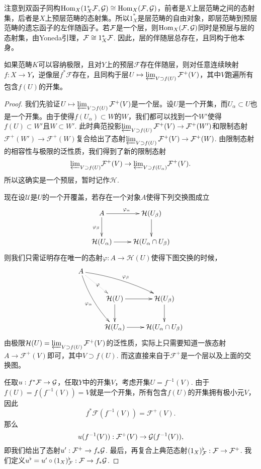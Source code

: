 注意到双函子同构$\operatorname{Hom}_X (1_X^* \mathcal{F},\mathcal{G})\cong \operatorname{Hom}_X(\mathcal{F},\mathcal{G})$，前者是$X$上层范畴之间的态射集，后者是$X$上预层范畴的态射集。所以$1_X^*$是层范畴的自由对象，即层范畴到预层范畴的遗忘函子的左伴随函子。若$\mathcal{F}$是一个层，则$\operatorname{Hom}_X(\mathcal{F},\mathcal{G})$同时是预层与层的态射集，由Yoneda引理，$\mathcal{F}\cong 1_X^* \mathcal{F}$. 因此，层的伴随层总存在，且同构于他本身。

\begin{lem}
如果范畴$K$可以容纳极限，且对$Y$上的预层$\mathcal{F}$存在伴随层，则对任意连续映射$f :X\to Y$，逆像层$f^*\mathcal{F}$存在，且同构于层$U\mapsto \varprojlim_{V\supset f(U)} \mathcal{F}^+(V)$，其中$V$跑遍所有包含$f(U)$的开集。
\end{lem}

\begin{proof}
	我们先验证$U\mapsto \varprojlim_{V\supset f(U)} \mathcal{F}^+(V)$是一个层。设$U$是一个开集，而$U_\alpha\subset U$也是一个开集。由于使得$f(U_\alpha)\subset W$的$W$，我们都可以找到一个$W'$使得$f(U)\subset W'$且$W\subset W'$. 此时典范投影$\varprojlim_{V\supset f(U)} \mathcal{F}^+(V)\to \mathcal{F}^+(W')$和限制态射$\mathcal{F}^+(W')\to \mathcal{F}^+(W)$复合给出了态射$\varprojlim_{V\supset f(U)} \mathcal{F}^+(V)\to \mathcal{F}^+(W)$. 由限制态射的相容性与极限的泛性质，我们得到了新的限制态射
	\[
	{\varprojlim}_{V\supset f(U)} \mathcal{F}^+(V)\to {\varprojlim}_{V\supset f(U_\alpha)} \mathcal{F}^+(V).
	\]
	所以这确实是一个预层，暂时记作$\mathcal{H}$.

	现在设$\mathscr{U}$是$U$的一个开覆盖，若存在一个对象$A$使得下列交换图成立
	\[
	\xymatrix{
		A\ar[r]^{\varphi_{\alpha}}\ar[d]_{\varphi_{\beta}}&\mathcal{H}(U_\beta)\ar[d]\\
		\mathcal{H}(U_\alpha)\ar[r]&\mathcal{H}(U_{\alpha}\cap U_{\beta})
	}
	\]
	则我们只需证明存在唯一的态射$\varphi:A\to \mathcal{H}(U)$使得下图交换的时候，
	\[
		\xymatrix{
			A\ar@/_/[ddr]_{\varphi_{\alpha}}\ar@/^/[drr]^{\varphi_{\beta}}\ar@{.>}[dr]|{\varphi}&& \\
			&\mathcal{H}(U)\ar[r]\ar[d]&\mathcal{H}(U_\beta)\ar[d]\\
			&\mathcal{H}(U_\alpha)\ar[r]&\mathcal{H}(U_{\alpha}\cap U_{\beta})
		}
	\]
	由极限$\mathcal{H}(U)=\varprojlim_{V\supset f(U)} \mathcal{F}^+(V)$的泛性质，实际上只需要知道一族态射$A\to \mathcal{F}^+(V)$即可，其中$V\supset f(U)$. 而这直接来自于$\mathcal{F}^+$是一个层以及上面的交换图。

	任取$u:f^*\mathcal{F}\to\mathcal{G}$，任取$Y$中的开集$V$，考虑开集$U=f^{-1}(V)$. 由于$f(U)=f(f^{-1}(V))=V$就是一个开集，所有包含$f(U)$的开集拥有极小元$V$，因此
	\[
	f^*\mathcal{F}(f^{-1}(V))=\mathcal{F}^+(V).
	\]
	那么
	\[
	u(f^{-1}(V)):\mathcal{F}^+(V)\to \mathcal{G}(f^{-1}(V)),
	\]
	即我们给出了态射$u':\mathcal{F}^+\to f_*\mathcal{G}$. 最后，再复合上典范态射$(1_X)^\flat_{\mathcal{F}}:\mathcal{F} \to \mathcal{F}^+$. 我们定义$u^\flat=u'\circ (1_X)^\flat_{\mathcal{F}}: \mathcal{F}\to f_*\mathcal{G}$.


\end{proof}

